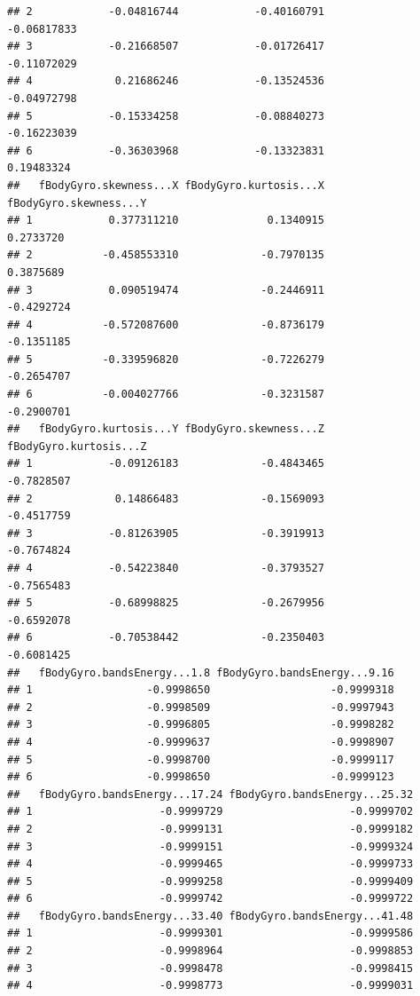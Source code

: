 \documentclass[
]{article}
\begin{document}
\begin{verbatim}
## 2            -0.04816744            -0.40160791            -0.06817833
## 3            -0.21668507            -0.01726417            -0.11072029
## 4             0.21686246            -0.13524536            -0.04972798
## 5            -0.15334258            -0.08840273            -0.16223039
## 6            -0.36303968            -0.13323831             0.19483324
##   fBodyGyro.skewness...X fBodyGyro.kurtosis...X fBodyGyro.skewness...Y
## 1            0.377311210              0.1340915              0.2733720
## 2           -0.458553310             -0.7970135              0.3875689
## 3            0.090519474             -0.2446911             -0.4292724
## 4           -0.572087600             -0.8736179             -0.1351185
## 5           -0.339596820             -0.7226279             -0.2654707
## 6           -0.004027766             -0.3231587             -0.2900701
##   fBodyGyro.kurtosis...Y fBodyGyro.skewness...Z fBodyGyro.kurtosis...Z
## 1            -0.09126183             -0.4843465             -0.7828507
## 2             0.14866483             -0.1569093             -0.4517759
## 3            -0.81263905             -0.3919913             -0.7674824
## 4            -0.54223840             -0.3793527             -0.7565483
## 5            -0.68998825             -0.2679956             -0.6592078
## 6            -0.70538442             -0.2350403             -0.6081425
##   fBodyGyro.bandsEnergy...1.8 fBodyGyro.bandsEnergy...9.16
## 1                  -0.9998650                   -0.9999318
## 2                  -0.9998509                   -0.9997943
## 3                  -0.9996805                   -0.9998282
## 4                  -0.9999637                   -0.9998907
## 5                  -0.9998700                   -0.9999117
## 6                  -0.9998650                   -0.9999123
##   fBodyGyro.bandsEnergy...17.24 fBodyGyro.bandsEnergy...25.32
## 1                    -0.9999729                    -0.9999702
## 2                    -0.9999131                    -0.9999182
## 3                    -0.9999151                    -0.9999324
## 4                    -0.9999465                    -0.9999733
## 5                    -0.9999258                    -0.9999409
## 6                    -0.9999742                    -0.9999722
##   fBodyGyro.bandsEnergy...33.40 fBodyGyro.bandsEnergy...41.48
## 1                    -0.9999301                    -0.9999586
## 2                    -0.9998964                    -0.9998853
## 3                    -0.9998478                    -0.9998415
## 4                    -0.9998773                    -0.9999031

\end{verbatim}
\end{document}
